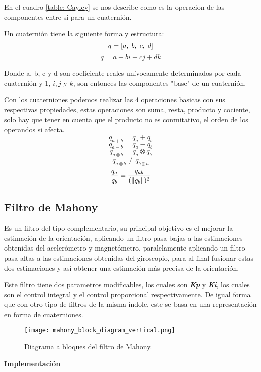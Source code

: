         En el cuadro \ref{table: Cayley} se nos describe como es la operacion de las componentes entre si para un cuaternión.

        Un cuaternión tiene la siguiente forma y estructura:
        $$ q = [a, \hspace{1mm} b, \hspace{1mm} c, \hspace{1mm} d]$$
        $$ q = a + bi +cj + dk $$

        Donde a, b, c y d son coeficiente reales unívocamente determinados por cada cuaternión y 
        1, $ i, j $ y $ k $, son entonces las componentes "base" de un cuaternión.

        Con los cuaterniones podemos realizar las 4 operaciones basicas con sus respectivas propiedades, estas operaciones son
        suma, resta, producto y cociente, solo hay que tener en cuenta que el producto no es conmitativo, el orden de los operandos
        si afecta.
        $$  q_{a+b} = q_a + q_b $$
        $$  q_{a-b} = q_a - q_b $$
        $$  q_{a \otimes b} = q_a \otimes q_b $$
        $$  q_{a \otimes b} \neq q_{b \otimes a}  $$
        $$  \frac{q_a}{q_b} = \frac{q_{ab}}{(\lVert q_b\rVert)^2} $$

    \subsection{Filtro de Mahony}
    Es un filtro del tipo complementario, su principal objetivo es el mejorar la estimación de la orientación, aplicando un filtro pasa bajas a las estimaciones obtenidas del acelerómetro y magnetómetro, paralelamente aplicando un filtro pasa altas a las estimaciones obtenidas del giroscopio, para al final fusionar estas dos estimaciones y así obtener una estimación más precisa de la orientación. 
    
    Este filtro tiene dos parametros modificables, los cuales son \textbf{\textit{Kp}} y \textbf{\textit{Ki}}, los cuales son el control integral y el control proporcional respectivamente. De igual forma que con otro tipo de filtros de la misma índole, este se basa en una representación en forma de cuaterniones.
    \begin{figure}[htp]
        \centering
             \texttt{[image: mahony\_block\_diagram\_vertical.png]}
              \caption{Diagrama a bloques del filtro de Mahony.}
    \end{figure}
    \FloatBarrier 


    \textbf{Implementación}

